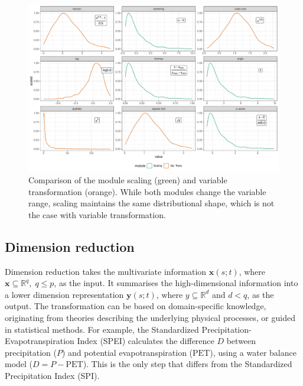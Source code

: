 \documentclass[
]{interact}
\begin{document}
\begin{figure}

{\centering \includegraphics{tidyindex_files/figure-pdf/fig-scale-var-trans-compare-1.pdf}

}

\caption{\label{fig-scale-var-trans-compare}Comparison of the module
scaling (green) and variable transformation (orange). While both modules
change the variable range, scaling maintains the same distributional
shape, which is not the case with variable transformation.}

\end{figure}

\hypertarget{dimension-reduction}{%
\subsection{Dimension reduction}\label{dimension-reduction}}

Dimension reduction takes the multivariate information
\(\mathbf{x}(s;t)\), where
\(\mathbf{x} \subseteq \mathbb{R}^q,\; q\leq p\), as the input. It
summarises the high-dimensional information into a lower dimension
representation \(\mathbf{y}(s;t)\), where \(y \subseteq \mathbb{R}^d\)
and \(d < q\), as the output. The transformation can be based on
domain-specific knowledge, originating from theories describing the
underlying physical processes, or guided in statistical methods. For
example, the Standardized Precipitation-Evapotranspiration Index (SPEI)
calculates the difference \(D\) between precipitation (\(P\)) and
potential evapotranspiration (\(\text{PET}\)), using a water balance
model (\(D = P - \text{PET}\)). This is the only step that differs from
the Standardized Precipitation Index (SPI).
\end{document}
